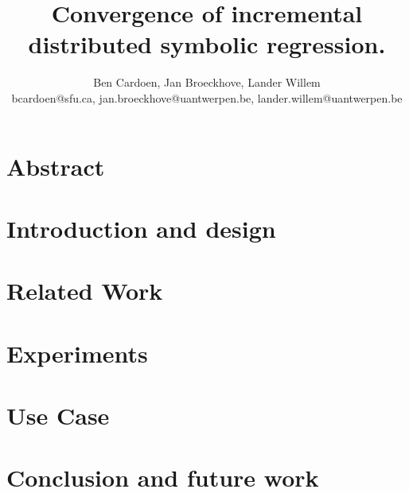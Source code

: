 \documentclass[twocolumn]{article}
\title{Convergence of incremental distributed symbolic regression.
    }
\author{
    Ben Cardoen, Jan Broeckhove, Lander Willem  \\
    {bcardoen@sfu.ca, jan.broeckhove@uantwerpen.be, lander.willem@uantwerpen.be}
}
\date{}
\begin{document}
    
    \maketitle
    \section{Abstract}
    
    \section{Introduction and design}
    
    \section{Related Work}
    
    \section{Experiments}
    
    \section{Use Case}
    
    \section{Conclusion and future work}
    
%    
    
    
    
\end{document}
